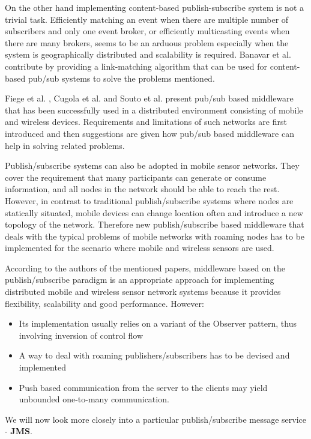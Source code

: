 \documentclass{sigplanconf}
\begin{document}
On the other hand implementing content-based publish-subscribe system is not a trivial task. Efficiently matching an event when there are multiple number of subscribers and only one event broker, or efficiently multicasting events when there are many brokers, seems to be an arduous problem especially when the system is geographically distributed and scalability is required. Banavar et al. \cite{pubsub1} contribute by providing a link-matching algorithm that can be used for content-based pub/sub systems to solve the problems mentioned.

Fiege et al. \cite{pubsub2}, Cugola et al. \cite{pubsub3} and Souto et al. \cite{pubsub5} present pub/sub based middleware that has been successfully used in a distributed environment consisting of mobile and wireless devices. Requirements and limitations of such networks are first introduced and then suggestions are given how pub/sub based middleware can help in solving related problems.

Publish/subscribe systems can also be adopted in mobile sensor networks. They cover the requirement that many participants can generate or consume information, and all nodes in the network should be able to reach the rest. However, in contrast to traditional publish/subscribe systems where nodes are statically situated, mobile devices can change location often and introduce a new topology of the network. Therefore new publish/subscribe based middleware that deals with the typical problems of mobile networks with roaming nodes has to be implemented for the scenario where mobile and wireless sensors are used.

According to the authors of the mentioned papers, middleware based on the publish/subscribe paradigm is an appropriate approach for implementing distributed mobile and wireless sensor network systems because it provides flexibility, scalability and good performance. However:

\begin{itemize} \itemsep1pt \parskip0pt 
  \item Its implementation usually relies on a variant of the Observer pattern, thus involving inversion of control flow
  \item A way to deal with roaming publishers/subscribers has to be devised and implemented
  \item Push based communication from the server to the clients may yield unbounded one-to-many communication.
\end{itemize}
We will now look more closely into a particular publish/subscribe message service - \textbf{JMS}.
\end{document}
